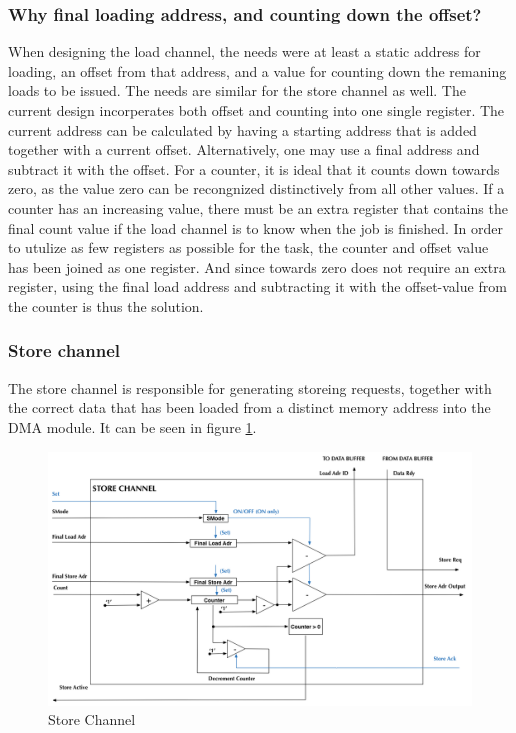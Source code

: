 \subsubsection{Why final loading address, and counting down the offset?}
When designing the load channel, the needs were at least a static address for loading, an offset from that address, and a value for counting down the remaning loads to be issued.
The needs are similar for the store channel as well.
The current design incorperates both offset and counting into one single register.
The current address can be calculated by having a starting address that is added together with a current offset.
Alternatively, one may use a final address and subtract it with the offset.
 For a counter, it is ideal that it counts down towards zero, as the value zero can be recongnized distinctively from all other values.
If a counter has an increasing value, there must be an extra register that contains the final count value if the load channel is to know when the job is finished.
In order to utulize as few registers as possible for the task, the counter and offset value has been joined as one register.
And since towards zero does not require an extra register, using the final load address and subtracting it with the offset-value from the counter is thus the solution.


\subsubsection{Store channel}
The store channel is responsible for generating storeing requests, together with the correct data that has been loaded from a distinct memory address into the DMA module.
It can be seen in figure \ref{fig:storeChannel}.


\begin{figure}[h!]
    \centering
    \includegraphics[width=1.0\textwidth]{Figures/DMA/StoreChannel}
    \caption{Store Channel}
    \label{fig:storeChannel}
\end{figure}


